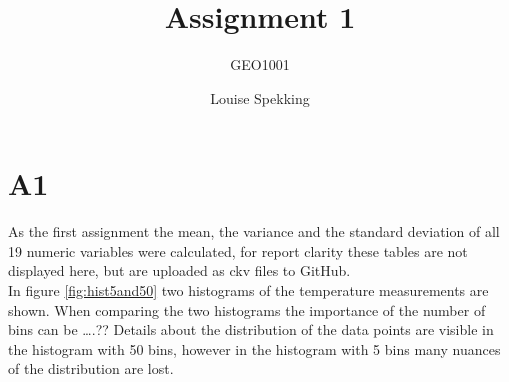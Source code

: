 \documentclass[whitelogo]{tudelft-report}
\begin{document}
\frontmatter


\title[tudelft-white]{Assignment 1}
\subtitle[tudelft-black]{GEO1001}
\author[tudelft-white]{Louise Spekking}
\makecover[split]


%

%

\tableofcontents


\mainmatter

\chapter {A1}


As the first assignment the mean, the variance and the standard deviation of all 19 numeric variables were calculated, for report clarity these tables are not displayed here, but are uploaded as ckv files to GitHub. 
\\
In figure \ref{fig:hist5and50} two histograms of the temperature measurements are shown. When comparing the two histograms the importance of the number of bins can be ….?? Details about the distribution of the data points are visible in the histogram with 50 bins, however in the histogram with 5 bins many nuances of the distribution are lost. 
 
\end{document}
